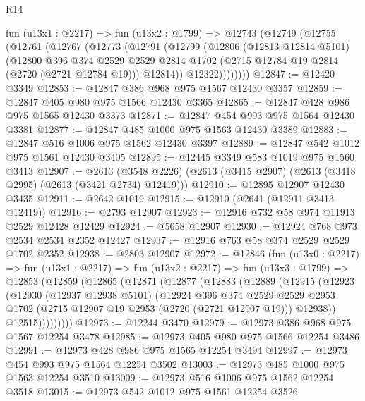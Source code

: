 \begin{lexlean}{R14}
\begin{coremodule}
    fun (u13x1 : @2217) =>
    fun (u13x2 : @1799) =>
    @12743
      (@12749
        (@12755
          (@12761
            (@12767
              (@12773
                (@12791
                  (@12799
                    (@12806
                      (@12813 @12814 @5101)
                      (@12800
                        @396
                        @374
                        @2529
                        @2529
                        @2814
                        @1702
                        (@2715 @12784 @19 @2814 (@2720 (@2721 @12784 @19)))
                        @12814))
                    @12322))))))))
@12847 := @12420 @3349
@12853 := @12847 @386 @968 @975 @1567 @12430 @3357
@12859 := @12847 @405 @980 @975 @1566 @12430 @3365
@12865 := @12847 @428 @986 @975 @1565 @12430 @3373
@12871 := @12847 @454 @993 @975 @1564 @12430 @3381
@12877 := @12847 @485 @1000 @975 @1563 @12430 @3389
@12883 := @12847 @516 @1006 @975 @1562 @12430 @3397
@12889 := @12847 @542 @1012 @975 @1561 @12430 @3405
@12895 := @12445 @3349 @583 @1019 @975 @1560 @3413
@12907 := @2613
    (@3548 @2226)
    (@2613 (@3415 @2907) (@2613 (@3418 @2995) (@2613 (@3421 @2734) @12419)))
@12910 := @12895 @12907 @12430 @3435
@12911 := @2642 @1019
@12915 := @12910 (@2641 (@12911 @3413 @12419))
@12916 := @2793 @12907
@12923 := @12916 @732 @58 @974 @11913 @2529 @12428 @12429
@12924 := @5658 @12907
@12930 := @12924 @768 @973 @2534 @2534 @2352 @12427
@12937 := @12916 @763 @58 @374 @2529 @2529 @1702 @2352
@12938 := @2803 @12907
@12972 := @12846
    (fun (u13x0 : @2217) =>
    fun (u13x1 : @2217) =>
    fun (u13x2 : @2217) =>
    fun (u13x3 : @1799) =>
    @12853
      (@12859
        (@12865
          (@12871
            (@12877
              (@12883
                (@12889
                  (@12915
                    (@12923
                      (@12930
                        (@12937 @12938 @5101)
                        (@12924
                          @396
                          @374
                          @2529
                          @2529
                          @2953
                          @1702
                          (@2715 @12907 @19 @2953 (@2720 (@2721 @12907 @19)))
                          @12938))
                      @12515)))))))))
@12973 := @12244 @3470
@12979 := @12973 @386 @968 @975 @1567 @12254 @3478
@12985 := @12973 @405 @980 @975 @1566 @12254 @3486
@12991 := @12973 @428 @986 @975 @1565 @12254 @3494
@12997 := @12973 @454 @993 @975 @1564 @12254 @3502
@13003 := @12973 @485 @1000 @975 @1563 @12254 @3510
@13009 := @12973 @516 @1006 @975 @1562 @12254 @3518
@13015 := @12973 @542 @1012 @975 @1561 @12254 @3526

\end{coremodule}
\end{lexlean}
